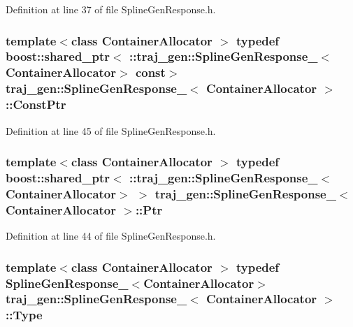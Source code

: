 Definition at line 37 of file Spline\+Gen\+Response.\+h.

\subsubsection[{\texorpdfstring{Const\+Ptr}{ConstPtr}}]{\setlength{\rightskip}{0pt plus 5cm}template$<$class Container\+Allocator $>$ typedef boost\+::shared\+\_\+ptr$<$ \+::{\bf traj\+\_\+gen\+::\+Spline\+Gen\+Response\+\_\+}$<$Container\+Allocator$>$ const$>$ {\bf traj\+\_\+gen\+::\+Spline\+Gen\+Response\+\_\+}$<$ Container\+Allocator $>$\+::{\bf Const\+Ptr}}\hypertarget{structtraj__gen_1_1_spline_gen_response___a98d2b3fc57ca918923c480b748f41fd0}{}\label{structtraj__gen_1_1_spline_gen_response___a98d2b3fc57ca918923c480b748f41fd0}


Definition at line 45 of file Spline\+Gen\+Response.\+h.

\subsubsection[{\texorpdfstring{Ptr}{Ptr}}]{\setlength{\rightskip}{0pt plus 5cm}template$<$class Container\+Allocator $>$ typedef boost\+::shared\+\_\+ptr$<$ \+::{\bf traj\+\_\+gen\+::\+Spline\+Gen\+Response\+\_\+}$<$Container\+Allocator$>$ $>$ {\bf traj\+\_\+gen\+::\+Spline\+Gen\+Response\+\_\+}$<$ Container\+Allocator $>$\+::{\bf Ptr}}\hypertarget{structtraj__gen_1_1_spline_gen_response___aac2c39221865ccbf6d203ded52dc9e51}{}\label{structtraj__gen_1_1_spline_gen_response___aac2c39221865ccbf6d203ded52dc9e51}


Definition at line 44 of file Spline\+Gen\+Response.\+h.

\subsubsection[{\texorpdfstring{Type}{Type}}]{\setlength{\rightskip}{0pt plus 5cm}template$<$class Container\+Allocator $>$ typedef {\bf Spline\+Gen\+Response\+\_\+}$<$Container\+Allocator$>$ {\bf traj\+\_\+gen\+::\+Spline\+Gen\+Response\+\_\+}$<$ Container\+Allocator $>$\+::{\bf Type}}\hypertarget{structtraj__gen_1_1_spline_gen_response___a033ff4c35ebdd04211abb4cda0c40447}{}\label{structtraj__gen_1_1_spline_gen_response___a033ff4c35ebdd04211abb4cda0c40447}



